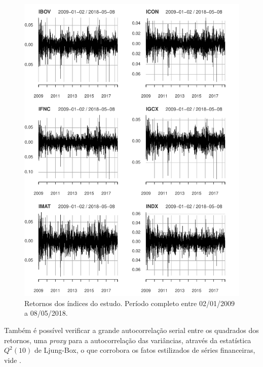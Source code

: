 \documentclass[1p]{elsarticle}
\theoremstyle{definition}
\begin{document}
\begin{figure}[H]
	\centering
	\includegraphics[width=1\linewidth]{figs/artigo-retornos}
	\caption{Retornos dos índices do estudo. Período completo entre 02/01/2009 a 08/05/2018.}
	\label{fig:artigo-retornos}
\end{figure}

Também é possível verificar a grande autocorrelação serial entre os quadrados dos retornos, uma \emph{proxy} para a autocorrelação das variâncias, através da estatística $Q^2(10)$ de Ljung-Box, o que corrobora os fatos estilizados de séries financeiras, vide \cite{Cont2001}.

\end{document}

